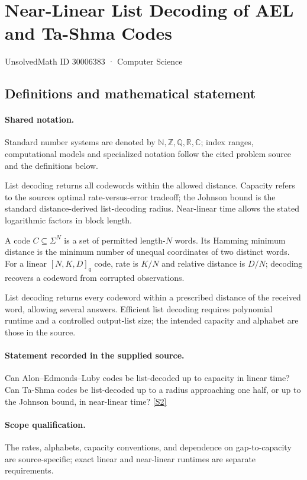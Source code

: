 \documentclass[11pt]{article}
\newcommand{\sref}[2]{\hyperlink{source:#1:#2}{[S#2]}}
\begin{document}
\setcounter{section}{30006382}
\section{Near-Linear List Decoding of AEL and Ta-Shma Codes}\label{30006383}
{\small\sffamily UnsolvedMath ID 30006383 · Computer Science}
\subsection{Definitions and mathematical statement}

\paragraph{Shared notation.}Standard number systems are denoted by $\mathbb N,\mathbb Z,\mathbb Q,\mathbb R,\mathbb C$; index ranges, computational models and specialized notation follow the cited problem source and the definitions below.


List decoding returns all codewords within the allowed distance. Capacity refers to the source\textquotesingle s optimal rate-versus-error tradeoff; the Johnson bound is the standard distance-derived list-decoding radius. Near-linear time allows the stated logarithmic factors in block length.

A code $C\subseteq\Sigma^N$ is a set of permitted length-$N$ words. Its Hamming minimum distance is the minimum number of unequal coordinates of two distinct words. For a linear $[N,K,D]_q$ code, rate is $K/N$ and relative distance is $D/N$; decoding recovers a codeword from corrupted observations.

List decoding returns every codeword within a prescribed distance of the received word, allowing several answers. Efficient list decoding requires polynomial runtime and a controlled output-list size; the intended capacity and alphabet are those in the source.
\paragraph{Statement recorded in the supplied source.}
Can Alon–Edmonds–Luby codes be list-decoded up to capacity in linear time? Can Ta-Shma codes be list-decoded up to a radius approaching one half, or up to the Johnson bound, in near-linear time? \sref{30006383}{2}
\paragraph{Scope qualification.}
The rates, alphabets, capacity conventions, and dependence on gap-to-capacity are source-specific; exact linear and near-linear runtimes are separate requirements.
\end{document}
